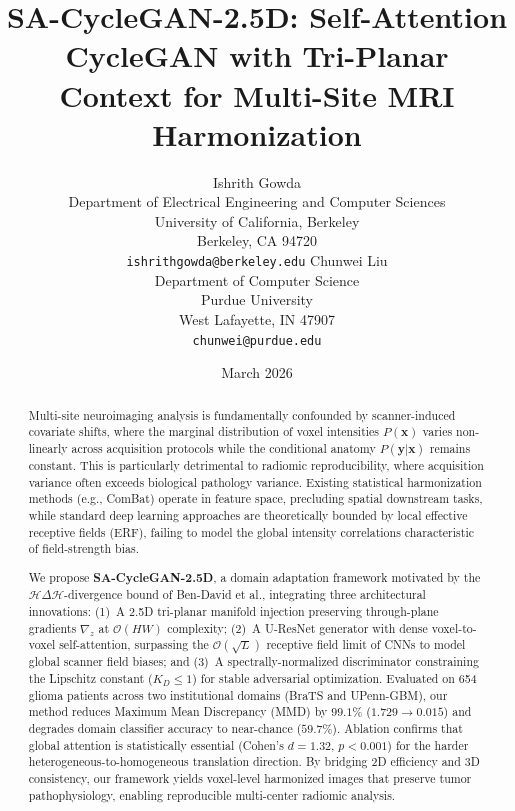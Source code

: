 \documentclass{article}
\title{SA-CycleGAN-2.5D: Self-Attention CycleGAN with Tri-Planar Context for Multi-Site MRI Harmonization}
\author{
  Ishrith Gowda \\
  Department of Electrical Engineering and Computer Sciences \\
  University of California, Berkeley \\
  Berkeley, CA 94720 \\
  \texttt{ishrithgowda@berkeley.edu}
  \And
  Chunwei Liu \\
  Department of Computer Science \\
  Purdue University \\
  West Lafayette, IN 47907 \\
  \texttt{chunwei@purdue.edu}
}
\date{March 2026}
\begin{document}
\maketitle

\begin{abstract}
Multi-site neuroimaging analysis is fundamentally confounded by scanner-induced covariate
shifts, where the marginal distribution of voxel intensities $P(\mathbf{x})$ varies
non-linearly across acquisition protocols while the conditional anatomy
$P(\mathbf{y}|\mathbf{x})$ remains constant. This is particularly detrimental to radiomic
reproducibility, where acquisition variance often exceeds biological pathology variance.
Existing statistical harmonization methods (e.g., ComBat) operate in feature space,
precluding spatial downstream tasks, while standard deep learning approaches are
theoretically bounded by local effective receptive fields (ERF), failing to model the
global intensity correlations characteristic of field-strength bias.

We propose \textbf{SA-CycleGAN-2.5D}, a domain adaptation framework motivated by the
$\mathcal{H}\Delta\mathcal{H}$-divergence bound of Ben-David et al., integrating three
architectural innovations: (1)~A 2.5D tri-planar manifold injection preserving
through-plane gradients $\nabla_z$ at $\mathcal{O}(HW)$ complexity; (2)~A U-ResNet
generator with dense voxel-to-voxel self-attention, surpassing the $\mathcal{O}(\sqrt{L})$
receptive field limit of CNNs to model global scanner field biases; and (3)~A
spectrally-normalized discriminator constraining the Lipschitz constant ($K_D \le 1$) for
stable adversarial optimization. Evaluated on 654 glioma patients across two institutional
domains (BraTS and UPenn-GBM), our method reduces Maximum Mean Discrepancy (MMD) by
$99.1\%$ ($1.729 \to 0.015$) and degrades domain classifier accuracy to near-chance
($59.7\%$). Ablation confirms that global attention is statistically essential
(Cohen's $d{=}1.32$, $p{<}0.001$) for the harder heterogeneous-to-homogeneous translation
direction. By bridging 2D efficiency and 3D consistency, our framework yields voxel-level
harmonized images that preserve tumor pathophysiology, enabling reproducible multi-center
radiomic analysis.
\end{abstract}

\end{document}
